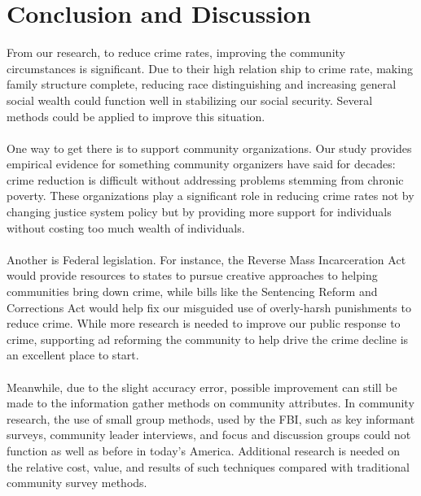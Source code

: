 \documentclass[letterpaper, 11 pt, conference]{article}
\begin{document}
\section{Conclusion and Discussion}
From our research, to reduce crime rates, improving the community circumstances is significant. Due to their high relation ship to crime rate, making family structure complete, reducing race distinguishing and increasing general social wealth could function well in stabilizing our social security. Several methods could be applied to improve this situation.
\\
\\One way to get there is to support community organizations. Our study provides empirical evidence for something community organizers have said for decades: crime reduction is difficult without addressing problems stemming from chronic poverty. These organizations play a significant role in reducing crime rates not by changing justice system policy but by providing more support for individuals without costing too much wealth of individuals. 
\\
\\Another is Federal legislation. For instance, the Reverse Mass Incarceration Act would provide resources to states to pursue creative approaches to helping communities bring down crime, while bills like the Sentencing Reform and Corrections Act would help fix our misguided use of overly-harsh punishments to reduce crime. While more research is needed to improve our public response to crime, supporting ad reforming the community to help drive the crime decline is an excellent place to start.
\\
\\Meanwhile, due to the slight accuracy error, possible improvement can still be made to the information gather methods on community attributes. In community research, the use of small group methods, used by the FBI, such as key informant surveys, community leader interviews, and focus and discussion groups could not function as well as before in today's America. Additional research is needed on the relative cost, value, and results of such techniques compared with traditional community survey methods.

\clearpage


\end{document}
